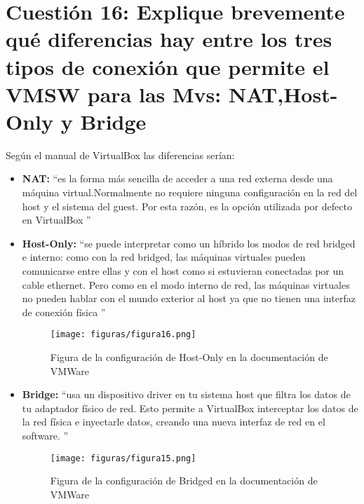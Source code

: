 \section{Cuestión 16: Explique brevemente qué diferencias hay entre los tres tipos de conexión que permite el VMSW para las Mvs: NAT,Host-Only y Bridge}
Según el manual de VirtualBox \cite{natvshstvsbrd} las diferencias serían:
\begin{itemize}
	\item \textbf{NAT: } \textquotedblleft es la forma más sencilla de acceder a una red externa desde una máquina virtual.Normalmente no requiere ninguna configuración en la red del host y el sistema del guest. Por esta razón, es la opción utilizada por defecto en VirtualBox \textquotedblright
	\item \textbf{Host-Only: } \textquotedblleft se puede interpretar como un híbrido los modos de red bridged e interno: como con la red bridged, las máquinas virtuales pueden comunicarse entre ellas y con el host como si estuvieran conectadas por un cable ethernet. Pero como en el modo interno de red, las máquinas virtuales no pueden hablar con el mundo exterior al host ya que no tienen una interfaz de conexión física \textquotedblright
	\begin{figure}[H] %
		\centering
		\texttt{[image: figuras/figura16.png]}  %
		\label{figura16}
		
		\caption{Figura de la configuración de Host-Only en la documentación de VMWare \cite{vmwarefigures}} 
	\end{figure}
	\item \textbf{Bridge: } \textquotedblleft usa un dispositivo driver en tu sistema host que filtra los datos de tu adaptador físico de red. Esto permite a VirtualBox interceptar los datos de la red física e inyectarle datos, creando una nueva interfaz de red en el software. \textquotedblright
	\begin{figure}[H] %
		\centering
		\texttt{[image: figuras/figura15.png]}  %
		\label{figura15}
		
		\caption{Figura de la configuración de Bridged en la documentación de VMWare \cite{vmwarefigures}} 
	\end{figure}
\end{itemize}
\newpage
